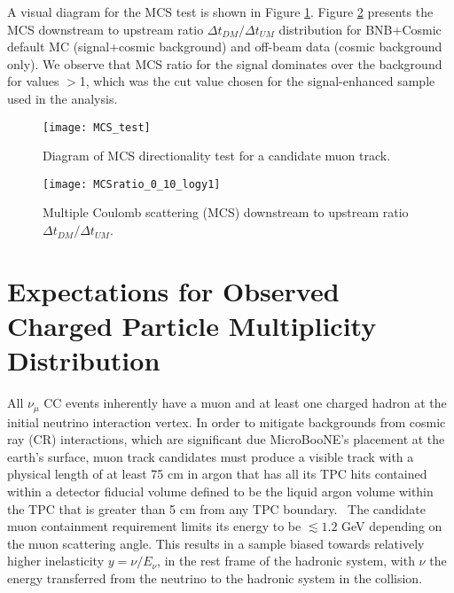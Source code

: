 \documentclass{article}
\begin{document}
A visual diagram for the MCS test is shown in Figure \ref{img:MCS test}.
Figure \ref{img:MCS_ratio} presents the MCS downstream to upstream ratio $%
\Delta t_{DM}/\Delta t_{UM}$ distribution for BNB+Cosmic default MC (signal+cosmic
background) and off-beam data (cosmic background only). We observe that MCS
ratio for the signal dominates over the background for values $>$1, which
was the cut value chosen for the signal-enhanced sample used in the analysis.\\

\begin{figure}[tbp]
\centering
\texttt{[image: MCS\_test]} %
\caption{Diagram of MCS directionality test for a candidate muon track.}
\label{img:MCS test}
\end{figure}

\begin{figure}[tbp]
\centering
\texttt{[image: MCSratio\_0\_10\_logy1]} 
\caption{Multiple Coulomb scattering (MCS) downstream to upstream ratio $%
\Delta t_{DM}/\Delta t_{UM}$. }
\label{img:MCS_ratio}
\end{figure}

\section{Expectations for Observed Charged Particle Multiplicity Distribution\ }

All $\nu _{\mu }$ CC events inherently have a muon and at least one charged
hadron at the initial neutrino interaction vertex. In order to mitigate
backgrounds from cosmic ray (CR) interactions, which are significant due
MicroBooNE's placement at the earth's surface, muon track candidates must
produce a visible track with a physical length of at least 75 cm in argon
that has all its TPC hits contained within a detector fiducial volume defined to be the liquid argon volume within the TPC that is greater than 5 cm from any TPC boundary. \
The candidate muon containment requirement limits its energy to be $\lesssim 1.2$ GeV depending on the muon scattering angle. This results in a sample biased towards relatively higher
inelasticity $y=\nu /E_{\nu }$, in the rest frame of the hadronic system, with $\nu$ the energy transferred from the
neutrino to the hadronic system in the collision.
\end{document}
